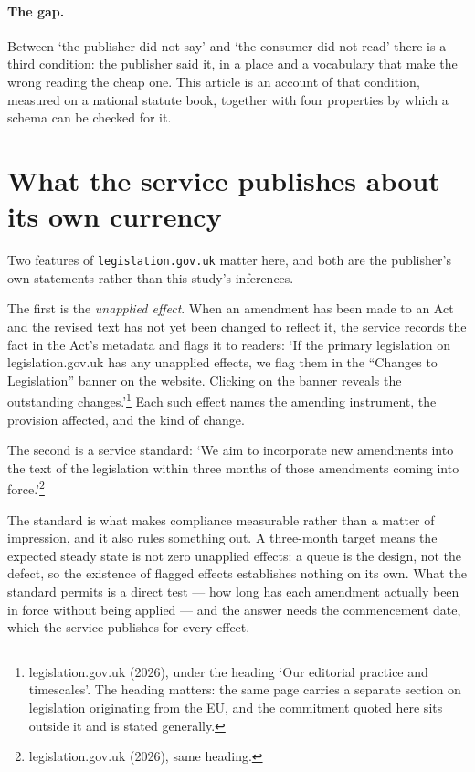 \documentclass[11pt]{article}
\begin{document}
\paragraph{The gap.} Between `the publisher did not say' and `the consumer did
not read' there is a third condition: the publisher said it, in a place and a
vocabulary that make the wrong reading the cheap one. This article is an
account of that condition, measured on a national statute book, together with
four properties by which a schema can be checked for it.

\section{What the service publishes about its own currency}

Two features of \texttt{legislation.gov.uk} matter here, and both are the
publisher's own statements rather than this study's inferences.

The first is the \emph{unapplied effect}. When an amendment has been made to an
Act and the revised text has not yet been changed to reflect it, the service
records the fact in the Act's metadata and flags it to readers: `If the primary
legislation on legislation.gov.uk has any unapplied effects, we flag them in
the ``Changes to Legislation'' banner on the website. Clicking on the banner
reveals the outstanding changes.'\footnote{legislation.gov.uk (2026), under the heading
`Our editorial practice and timescales'. The heading matters: the same page
carries a separate section on legislation originating from the EU, and the
commitment quoted here sits outside it and is stated generally.}
Each such effect names the amending instrument, the provision affected, and the
kind of change.

The second is a service standard: `We aim to incorporate new amendments into
the text of the legislation within three months of those amendments coming into
force.'\footnote{legislation.gov.uk (2026), same heading.}

The standard is what makes compliance measurable rather than a matter of
impression, and it also rules something out. A three-month target means the
expected steady state is not zero unapplied effects: a queue is the design, not
the defect, so the existence of flagged effects establishes nothing on its own.
What the standard permits is a direct test --- how long has each amendment
actually been in force without being applied --- and the answer needs the
commencement date, which the service publishes for every effect.
\end{document}
